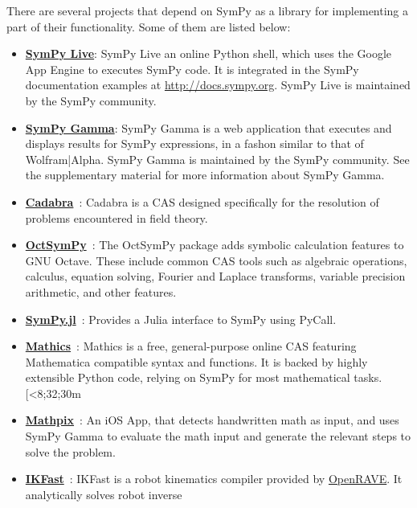 There are several projects that depend on SymPy as a library for implementing
a part of their functionality. Some of them are listed below:

\begin{itemize}
\item \href{http://live.sympy.org/}{\textbf{SymPy Live}}: SymPy Live an online
  Python shell, which uses the Google App Engine to executes SymPy code. It is
  integrated in the SymPy documentation examples at
  \href{http://docs.sympy.org}{http://docs.sympy.org}. SymPy Live is
  maintained by the SymPy community.
\item \href{http://sympygamma.com/}{\textbf{SymPy Gamma}}: SymPy Gamma is a
  web application that executes and displays results for SymPy expressions, in
  a fashon similar to that of Wolfram|Alpha. SymPy Gamma is maintained by the
  SymPy community. See the supplementary material for more information about
  SymPy Gamma.
\item
  \href{http://cadabra.science/index.html}{\textbf{Cadabra}}~\cite{Peeters2007cadabra}:
  Cadabra is a CAS designed specifically for the resolution of problems
  encountered in field theory.
\item
  \href{https://github.com/cbm755/octsympy}{\textbf{OctSymPy}}~\cite{OctSymPy}:
  The OctSymPy package adds symbolic calculation features
  to GNU Octave. These include common CAS tools such
  as algebraic operations, calculus, equation solving, Fourier and
  Laplace transforms, variable precision arithmetic, and other features.
\item
  \href{https://github.com/jverzani/SymPy.jl}{\textbf{SymPy.jl}}~\cite{SymPy.jl}:
  Provides a Julia interface to SymPy using PyCall.
\item
  \href{https://mathics.github.io/}{\textbf{Mathics}}~\cite{Mathics}: Mathics is a
  free, general-purpose online CAS featuring Mathematica compatible
  syntax and functions. It is backed by highly extensible Python code,
  relying on SymPy for most mathematical tasks.[<8;32;30m
\item
  \href{http://mathpix.com/}{\textbf{Mathpix}}~\cite{Mathpix}: An iOS App, that detects handwritten math as input, and uses
  SymPy Gamma to evaluate the math input and generate the relevant
  steps to solve the problem.
\item
  \href{http://openrave.org/docs/latest_stable/openravepy/ikfast/}{\textbf{IKFast}}~\cite{diankov2010ikfast}:
  IKFast is a robot kinematics compiler provided by
  \href{http://openrave.org/}{OpenRAVE}. It analytically solves robot inverse

\end{itemize}
